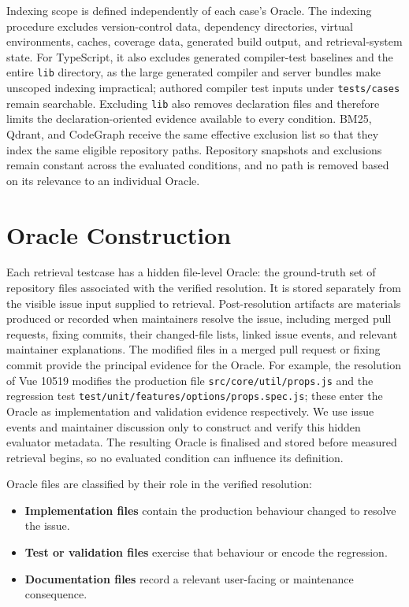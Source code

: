 Indexing scope is defined independently of each case's Oracle. The indexing procedure excludes version-control data, dependency directories, virtual environments, caches, coverage data, generated build output, and retrieval-system state. For TypeScript, it also excludes generated compiler-test baselines and the entire \texttt{lib} directory, as the large generated compiler and server bundles make unscoped indexing impractical; authored compiler test inputs under \texttt{tests/cases} remain searchable. Excluding \texttt{lib} also removes declaration files and therefore limits the declaration-oriented evidence available to every condition. BM25, Qdrant, and CodeGraph receive the same effective exclusion list so that they index the same eligible repository paths. Repository snapshots and exclusions remain constant across the evaluated conditions, and no path is removed based on its relevance to an individual Oracle.

\section{Oracle Construction}\label{sec:oracle-construction}

Each retrieval testcase has a hidden file-level Oracle: the ground-truth set of repository files associated with the verified resolution. It is stored separately from the visible issue input supplied to retrieval. Post-resolution artifacts are materials produced or recorded when maintainers resolve the issue, including merged pull requests, fixing commits, their changed-file lists, linked issue events, and relevant maintainer explanations. The modified files in a merged pull request or fixing commit provide the principal evidence for the Oracle. For example, the resolution of Vue 10519 modifies the production file \texttt{src/core/util/props.js} and the regression test \texttt{test/unit/features/options/props.spec.js}; these enter the Oracle as implementation and validation evidence respectively. We use issue events and maintainer discussion only to construct and verify this hidden evaluator metadata. The resulting Oracle is finalised and stored before measured retrieval begins, so no evaluated condition can influence its definition.

Oracle files are classified by their role in the verified resolution:

\begin{itemize}
\item \textbf{Implementation files} contain the production behaviour changed to resolve the issue.
\item \textbf{Test or validation files} exercise that behaviour or encode the regression.
\item \textbf{Documentation files} record a relevant user-facing or maintenance consequence.
\end{itemize}

